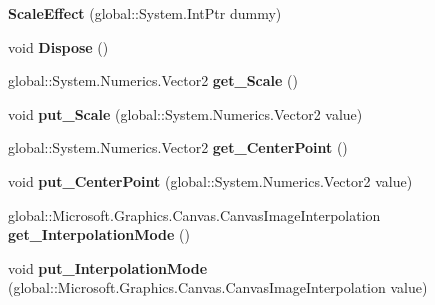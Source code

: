 \begin{DoxyCompactItemize}
{\bfseries Scale\+Effect} (global\+::\+System.\+Int\+Ptr dummy)
\item 
\mbox{\label{class_microsoft_1_1_graphics_1_1_canvas_1_1_effects_1_1_scale_effect_ab52eebaaf17c628936933cd6a741a5ea}} 
void {\bfseries Dispose} ()
\item 
\mbox{\label{class_microsoft_1_1_graphics_1_1_canvas_1_1_effects_1_1_scale_effect_a1400b2406abf5e0f5cbbc65e62d972a8}} 
global\+::\+System.\+Numerics.\+Vector2 {\bfseries get\+\_\+\+Scale} ()
\item 
\mbox{\label{class_microsoft_1_1_graphics_1_1_canvas_1_1_effects_1_1_scale_effect_abad94b5a03e0d8d94a4debbbdcd3f40a}} 
void {\bfseries put\+\_\+\+Scale} (global\+::\+System.\+Numerics.\+Vector2 value)
\item 
\mbox{\label{class_microsoft_1_1_graphics_1_1_canvas_1_1_effects_1_1_scale_effect_a9d815198599b7d00f100c60af3b8041b}} 
global\+::\+System.\+Numerics.\+Vector2 {\bfseries get\+\_\+\+Center\+Point} ()
\item 
\mbox{\label{class_microsoft_1_1_graphics_1_1_canvas_1_1_effects_1_1_scale_effect_ad8dc6bf2e2ca3e80d98f064ddd0a397f}} 
void {\bfseries put\+\_\+\+Center\+Point} (global\+::\+System.\+Numerics.\+Vector2 value)
\item 
\mbox{\label{class_microsoft_1_1_graphics_1_1_canvas_1_1_effects_1_1_scale_effect_ad18e24625d2ccb68c1fd0744ffc321c1}} 
global\+::\+Microsoft.\+Graphics.\+Canvas.\+Canvas\+Image\+Interpolation {\bfseries get\+\_\+\+Interpolation\+Mode} ()
\item 
\mbox{\label{class_microsoft_1_1_graphics_1_1_canvas_1_1_effects_1_1_scale_effect_ae3c6744fdad7dab003b76ec0fbb99024}} 
void {\bfseries put\+\_\+\+Interpolation\+Mode} (global\+::\+Microsoft.\+Graphics.\+Canvas.\+Canvas\+Image\+Interpolation value)

\end{DoxyCompactItemize}
